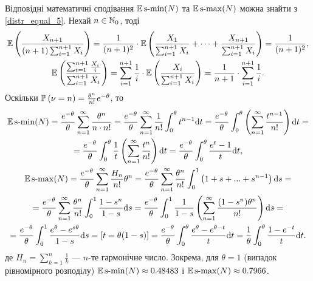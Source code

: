 Відповідні математичні сподівання $\E\smin(N)$ та $\E\smax(N)$ можна знайти з \eqref{distr_equal_5}. 
Нехай $n \in \N_0$, тоді
\begin{gather*}
    \E\left(
        \frac{X_{n+1}}{(n+1)\sum_{i=1}^{n+1} X_i}
    \right) = \frac{1}{(n+1)^2}\cdot \E \left(
        \frac{X_1}{\sum_{i=1}^{n+1} X_i} + \dots + \frac{X_{n+1}}{\sum_{i=1}^{n+1} X_i}
    \right) = \frac{1}{(n+1)^2}, \\
    \E\left(
        \frac{\sum_{i=1}^{n+1} \frac{X_i}{i}}{\sum_{i=1}^{n+1} X_i}
    \right) = 
    \sum_{i=1}^{n+1} \frac{1}{i} \cdot \E\left(\frac{X_i}{\sum_{i=1}^{n+1} X_i}\right) = 
    \frac{1}{n+1} \cdot \sum_{i=1}^{n+1} \frac{1}{i}.
\end{gather*}
Оскільки $\P{\nu = n} = \frac{\theta^n}{n!}e^{-\theta}$, то
\begin{gather*}
    \E\smin(N) = \frac{e^{-\theta}}{\theta}\sum_{n=1}^{\infty} \frac{\theta^n}{n\cdot n!} =
    \frac{e^{-\theta}}{\theta} \sum_{n=1}^{\infty} \frac{1}{n!} \int_0^{\theta} t^{n-1} \d t = 
    \frac{e^{-\theta}}{\theta} \int_0^{\theta} \left( \sum_{n=1}^{\infty} \frac{t^{n-1}}{n!} \right) \d t = \\ =
    \frac{e^{-\theta}}{\theta} \int_0^{\theta} \frac{1}{t} \left( \sum_{n=1}^{\infty} \frac{t^{n}}{n!} \right) \d t = 
    \frac{e^{-\theta}}{\theta}\int_0^\theta \frac{e^t-1}{t}\d t, \\
    \E\smax(N) = \frac{e^{-\theta}}{\theta}\sum_{n=1}^{\infty} \frac{H_n}{n!} \theta^n = 
    \frac{e^{-\theta}}{\theta}\sum_{n=1}^{\infty} \frac{\theta^n}{n!} \int_0^1 \left(1 + s + ... + s^{n-1}\right) \d s = \\ =
    \frac{e^{-\theta}}{\theta}\sum_{n=1}^{\infty} \frac{\theta^n}{n!} \int_0^1 \frac{1 - s^n}{1 - s} \d s = 
    \frac{e^{-\theta}}{\theta} \int_0^1 \frac{1}{1 - s} \left(
        \sum_{n=1}^{\infty} \frac{(1 - s^n)\theta^n}{n!}
    \right) \d s = \\ =
    \frac{e^{-\theta}}{\theta} \int_0^1 \frac{e^{\theta} - e^{s \theta}}{1 - s} \d s = 
    \left[ t = \theta (1 - s)\right] = 
    \frac{e^{-\theta}}{\theta} \int_0^{\theta} \frac{e^{\theta} - e^{\theta - t}}{t} \d t = 
    \frac{1}{\theta} \int_0^{\theta} \frac{1-e^{-t}}{t}\d t.
\end{gather*}
де $H_n = \sum_{k=1}^n \frac{1}{k}$ --- $n$-те гармонічне число.
Зокрема, для $\theta = 1$ (випадок рівномірного розподілу) 
$\E\smin(N) \approx 0.48483$ і $\E\smax(N) \approx 0.7966$.


